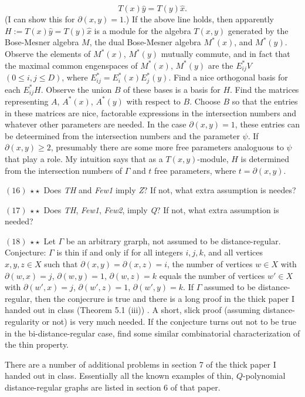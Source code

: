 \documentclass[
]{book}
\theoremstyle{definition}
\theoremstyle{definition}
\theoremstyle{definition}
\theoremstyle{definition}
\theoremstyle{remark}
\begin{document}
\[T(x)\hat{y} = T(y)\hat{x}.\]
(I can show this for \(\partial(x,y)=1\).) If the above line holds, then apparently \(H:=T(x)\hat{y} = T(y)\hat{x}\) is a module for the algebra \(T(x,y)\) generated by the Bose-Mesner algebra \(M\), the dual Bose-Mesner algebra \(M^*(x)\), and \(M^*(y)\). Observe the elements of \(M^*(x)\), \(M^*(y)\) mutually commute, and in fact that the maximal common engenspaces of \(M^*(x)\), \(M^*(y)\) are the \(E^*_{ij}V\) \((0\leq i,j\leq D)\), where \(E^*_{ij} = E^*_i(x)E^*_j(y)\). Find a nice orthogonal basis for each \(E^*_{ij}H\). Observe the union \(B\) of these bases is a basis for \(H\). Find the matrices representing \(A\), \(A^*(x)\), \(A^*(y)\) with respect to \(B\). Choose \(B\) so that the entries in these matrices are nice, factorable expressions in the intersection numbers and whatever other parameters are needed. In the case \(\partial(x,y)=1\), these entries can be deteermined from the intersection numbers and the parameter \(\psi\). If \(\partial(x,y)\geq 2\), presumably there are some more free parameters analoguous to \(\psi\) that play a role. My intuition says that as a \(T(x,y)\)-module, \(H\) is determined from the intersection numbers of \(\Gamma\) and \(t\) free parameters, where \(t = \partial(x,y)\).

\hfill\break
\((16)\) \(\star\star\) Does \emph{TH} and \emph{Few1} imply \emph{Z}? If not, what extra assumption is needes?

\hfill\break
\((17)\) \(\star\star\) Does \emph{TH}, \emph{Few1}, \emph{Few2}, imply \emph{Q}? If not, what extra assumption is needed?

\hfill\break
\((18)\) \(\star\star\) Let \(\Gamma\) be an arbitrary grarph, not assumed to be distance-regular. Conjecture: \(\Gamma\) is thin if and only if for all integers \(i,j,k\), and all vertices \(x,y,z\in X\) such that \(\partial(x,y) = \partial(x,z) = i\), the number of vertices \(w\in X\) with \(\partial(w,x) = j\), \(\partial(w,y) = 1\), \(\partial(w,z) = k\) equals the number of vertices \(w'\in X\) with \(\partial(w',x) = j\), \(\partial(w',z)=1\), \(\partial(w',y)=k\). If \(\Gamma\) assumed to be distance-regular, then the conjecrure is true and there is a long proof in the thick paper I handed out in class (Theorem 5.1 (iii)) . A short, slick proof (assuming distance-regularity or not) is very much needed. If the conjecture turns out not to be true in the bi-distance-regular case, find some similar combinatorial characterization of the thin property.

There are a number of additional problems in section 7 of the thick paper I handed out in class. Essentially all the known examples of thin, \(Q\)-polynomial distance-regular graphs are listed in section 6 of that paper.
\end{document}
